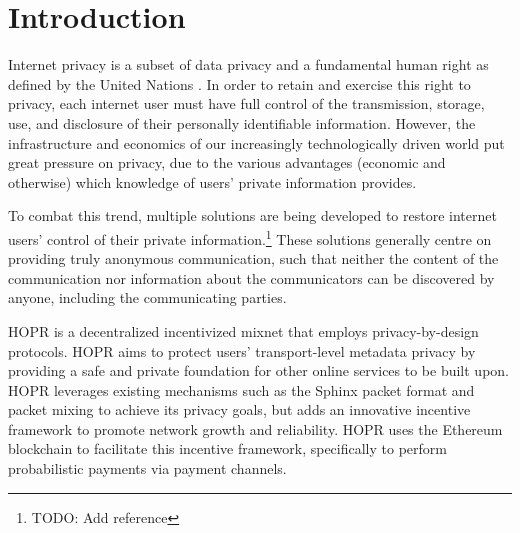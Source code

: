 
\section{Introduction}
\label{sec:intro}

Internet privacy is a subset of data privacy and a fundamental human right as defined by the United Nations \cite{un2018}. In order to retain and exercise this right to privacy, each internet user must have full control of the transmission, storage, use, and disclosure of their personally identifiable information. However, the infrastructure and economics of our increasingly technologically driven world put great pressure on privacy, due to the various advantages (economic and otherwise) which knowledge of users' private information provides.

To combat this trend, multiple solutions are being developed to restore internet users' control of their private information.\footnote{TODO: Add reference} These solutions generally centre on providing truly anonymous communication, such that neither the content of the communication nor information about the communicators can be discovered by anyone, including the communicating parties.

HOPR is a decentralized incentivized mixnet \cite{mixnets} that employs privacy-by-design protocols. HOPR aims to protect users' transport-level metadata privacy by providing a safe and private foundation for other online services to be built upon. HOPR leverages existing mechanisms such as the Sphinx packet format \cite{sphinxpaper} and packet mixing to achieve its privacy goals, but adds an innovative incentive framework to promote network growth and reliability. HOPR uses the Ethereum blockchain \cite{ethereum} to facilitate this incentive framework, specifically to perform probabilistic payments via payment channels.





